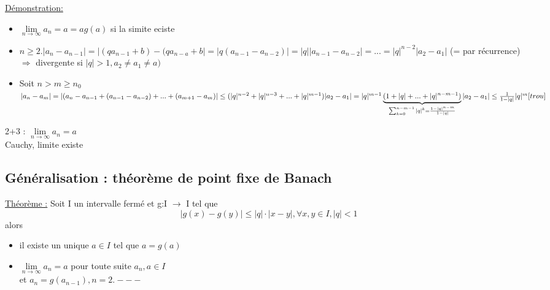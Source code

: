 \documentclass[12pt,a4paper]{article}
\newcommand{\limite}{\lim\limits_}
\newcommand{\ninf}{\ensuremath{n \to \infty}}
\begin{document}
{\underline{Démonstration:}
\begin{itemize}
\item $\limite{\ninf} a_n = a = ag(a)$ si la simite eciste
\item $n \geq 2. |a_n-a_{n-1}| = |(qa_{n-1}+b) - (qa_{n-a}+b| = |q(a_{n-1}-a_{n-2})| = |q||a_{n-1} - a_{n-2}| = ... = |q|^{n-2}|a_2-a_1|$ (= par récurrence) \\
$\Rightarrow$ divergente si $|q| > 1, a_2  \neq a_1 \neq a)$
\item Soit $n > m \geq n_0 $\\
$|a_n - a_m| = |(a_n - a_{n-1} + (a_{n-1}-a_{n-2}) + ... + (a_{m+1}-a_m)|\\
 \leq (|q|^{n-2} + |q|^{n-3} + ... + |q|^{m-1})|a_2-a_1|\\
 =|q|^{m-1}\underbrace{(1+|q|+...+|q|^{n-m-1})}_{\mathclap{\sum_{k=0}^{n-m-1} |q|^k = \frac{1-|q|^{n-m}}{1-|q|}}}|a_2-a_1|\\
 \leq \frac{1}{1-|q|} |q|^m[trou]$
\end{itemize}
2+3 : $\limite{\ninf} a_n = a$\\
Cauchy, limite existe
\subsection{Généralisation : théorème de point fixe de Banach}
\begin{boite}
\underline{Théorème :} Soit I un intervalle fermé et g:I $\to$ I tel que 
\begin{equation}
|g(x) - g(y)| \leq |q|\cdot|x-y|, \forall x,y \in I, |q| < 1
\end{equation}
alors \begin{itemize}
\item il existe un unique $a \in I$ tel que $a = g(a)$
\item $\limite{\ninf}a_n = a$ pour toute suite $a_n, a \in I$\\
et $a_n = g(a_{n-1}), n = 2.---$
\end{itemize}
\end{boite}	
}
\end{document}
